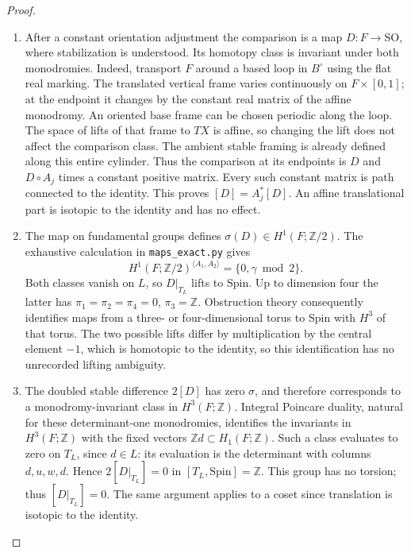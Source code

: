 \begin{proof}
\begin{enumerate}[label=\arabic*.,leftmargin=*]
\item After a constant orientation adjustment the comparison is
a map $D:F\to\mathrm{SO}$, where stabilization is understood.
Its homotopy class is invariant under both monodromies.
Indeed, transport $F$ around a based loop in $B^\circ$ using
the flat real marking.  The translated vertical frame varies
continuously on $F\times[0,1]$; at the endpoint it changes by
the constant real matrix of the affine monodromy.  An oriented
base frame can be chosen periodic along the loop.  The space
of lifts of that frame to $TX$ is affine, so changing the lift
does not affect the comparison class.  The ambient stable
framing is already defined along this entire cylinder.  Thus
the comparison at its endpoints is $D$ and $D\circ A_j$
times a constant positive matrix.  Every such constant
matrix is path connected to the identity.  This proves
$[D]=A_j^*[D]$.  An affine translational part is isotopic
to the identity and has no effect.

\item The map on fundamental groups defines
$\sigma(D)\in H^1(F;\mathbb Z/2)$.  The exhaustive calculation
in \texttt{maps\_exact.py} gives
\[
 H^1(F;\mathbb Z/2)^{\langle A_1,A_2\rangle}
      =\{0,\gamma\bmod2\}.
\]
Both classes vanish on $L$, so $D|_{T_L}$ lifts to
$\mathrm{Spin}$.  Up to dimension four the latter has
$\pi_1=\pi_2=\pi_4=0$, $\pi_3=\mathbb Z$.
Obstruction theory consequently identifies maps from a
three- or four-dimensional torus to $\mathrm{Spin}$ with
$H^3$ of that torus.  The two possible lifts differ by
multiplication by the central element $-1$, which is
homotopic to the identity, so this identification has no
unrecorded lifting ambiguity.

\item The doubled stable difference $2[D]$ has zero $\sigma$,
and therefore corresponds to a monodromy-invariant class
in $H^3(F;\mathbb Z)$.  Integral Poincare duality, natural
for these determinant-one monodromies, identifies the
invariants in $H^3(F;\mathbb Z)$ with the fixed vectors
$\mathbb Zd\subset H_1(F;\mathbb Z)$.  Such a class
evaluates to zero on $T_L$, since $d\in L$:
its evaluation is the determinant with columns $d,u,w,d$.
Hence $2[D|_{T_L}]=0$ in $[T_L,\mathrm{Spin}]=\mathbb Z$.
This group has no torsion; thus $[D|_{T_L}]=0$.
The same argument applies to a coset since translation is
isotopic to the identity.
\end{enumerate}
\end{proof}

